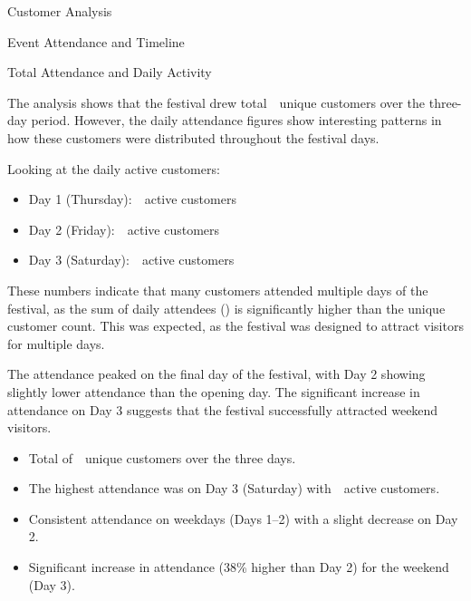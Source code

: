 \begin{section}{Customer Analysis}
\begin{subsection}{Event Attendance and Timeline}
		\pagebreak[4]

		\begin{subsubsection}{Total Attendance and Daily Activity}
			\label{subsubsec:analysis-total-attendance}


			The analysis shows that the festival drew total~~unique customers over the three-day period.
			However, the daily attendance figures show interesting patterns in how these customers were distributed throughout the festival days.

			Looking at the daily active customers:
			\begin{itemize}
				\item Day 1 (Thursday):~~active customers
				\item Day 2 (Friday):~~active customers
				\item Day 3 (Saturday):~~active customers
			\end{itemize}

			These numbers indicate that many customers attended multiple days of the festival, as the sum of daily attendees () is significantly higher than the unique customer count.
			This was expected, as the festival was designed to attract visitors for multiple days.

			The attendance peaked on the final day of the festival, with Day 2 showing slightly lower attendance than the opening day.
			The significant increase in attendance on Day 3 suggests that the festival successfully attracted weekend visitors.

			\begin{keytakeaways}
				\begin{itemize}
					\item Total of~~unique customers over the three days.
					\item The highest attendance was on Day 3 (Saturday) with~~active customers.
					\item Consistent attendance on weekdays (Days 1–2) with a slight decrease on Day 2.
					\item Significant increase in attendance (38\% higher than Day 2) for the weekend (Day 3).
				\end{itemize}
			\end{keytakeaways}
		\end{subsubsection}


\end{subsection}
\end{section}
